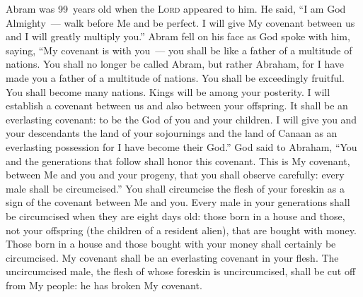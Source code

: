 
\begin{inparaenum}
     Abram was 99~years old when the \textsc{Lord} appeared to him. He said, ``I am God Almighty~--- walk before Me and be perfect.%
     I will give My covenant between us and I will greatly multiply you.''%
     Abram fell on his face as God spoke with him, saying,%
     ``My covenant is with you~--- you shall be like a father of a multitude of nations.%
     You shall no longer be called Abram, but rather Abraham, for I have made you a father of a multitude of nations.%
     You shall be exceedingly fruitful. You shall become many nations. Kings will be among your posterity.%
     I will establish a covenant between us and also between your offspring. It shall be an everlasting covenant: to be the God of you and your children.%
     I will give you and your descendants the land of your sojournings and the land of Canaan as an everlasting possession for I have become their God.''%
     God said to Abraham, ``You and the generations that follow shall honor this covenant.%
     This is My covenant, between Me and you and your progeny, that you shall observe carefully: every male shall be circumcised.''%
     You shall circumcise the flesh of your foreskin as a sign of the covenant between Me and you.%
     Every male in your generations shall be circumcised when they are eight days old: those born in a house and those, not your offspring (the children of a resident alien), that are bought with money.%
     Those born in a house and those bought with your money shall certainly be circumcised. My covenant shall be an everlasting covenant in your flesh.%
     The uncircumcised male, the flesh of whose foreskin is uncircumcised, shall be cut off from My people: he has broken My covenant.%
    

\end{inparaenum}
